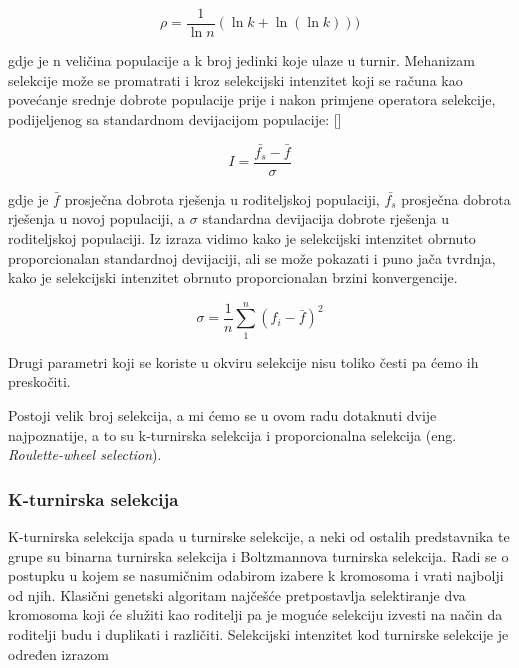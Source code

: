 \documentclass[times, utf8, zavrsni]{fer}
\begin{document}
\begin{equation}
	\rho=\frac{1}{\ln{n}} (\ln{k} + \ln{(\ln{k})})) 
\end{equation}

gdje je n veličina populacije a k broj jedinki koje ulaze u turnir. Mehanizam selekcije može se promatrati i kroz selekcijski intenzitet koji se računa kao povećanje srednje dobrote populacije prije i nakon primjene operatora selekcije, podijeljenog sa standardnom devijacijom populacije: [\cite{Back1995, MillerAndGoldberg, MuhlenbeinAndVoosen, Thierens}]

\begin{equation}
	I=\frac{\bar{f_s} - \bar{f}}{\sigma}
\end{equation}

gdje je $\bar{f}$ prosječna dobrota rješenja u roditeljskoj populaciji, $\bar{f_s}$ prosječna dobrota rješenja u novoj populaciji, a $\sigma$ standardna devijacija dobrote rješenja u roditeljskoj populaciji. Iz izraza vidimo kako je selekcijski intenzitet obrnuto proporcionalan standardnoj devijaciji, ali se može pokazati i puno jača tvrdnja, kako je selekcijski intenzitet obrnuto proporcionalan brzini konvergencije. 

\begin{equation}
	\sigma=\frac{1}{n}\sum_{1}^{n}(f_i - \bar{f})^2
\end{equation}


Drugi parametri koji se koriste u okviru selekcije nisu toliko česti pa ćemo ih preskočiti. 

Postoji velik broj selekcija, a mi ćemo se u ovom radu dotaknuti dvije najpoznatije, a to su k-turnirska selekcija i proporcionalna selekcija (eng. \emph{Roulette-wheel selection}).

\subsubsection{K-turnirska selekcija}
K-turnirska selekcija spada u turnirske selekcije, a neki od ostalih predstavnika te grupe su binarna turnirska selekcija i Boltzmannova turnirska selekcija.
Radi se o postupku u kojem se nasumičnim odabirom izabere k kromosoma i vrati najbolji od njih. Klasični genetski algoritam najčešće pretpostavlja selektiranje dva kromosoma koji će služiti kao roditelji pa je moguće selekciju izvesti na način da roditelji budu i duplikati i različiti. Selekcijski intenzitet kod turnirske selekcije je određen izrazom 
\end{document}
